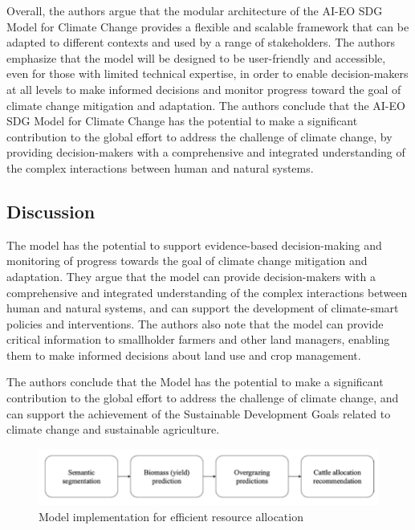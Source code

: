 \documentclass[draft, {\secondLanguage}, english]{volcanica-template}
\begin{document}
Overall, the authors argue that the modular architecture of the AI-EO SDG Model for Climate Change provides a flexible and scalable framework that can be adapted to different contexts and used by a range of stakeholders. The authors emphasize that the model will be designed to be user-friendly and accessible, even for those with limited technical expertise, in order to enable decision-makers at all levels to make informed decisions and monitor progress toward the goal of climate change mitigation and adaptation. The authors conclude that the AI-EO SDG Model for Climate Change has the potential to make a significant contribution to the global effort to address the challenge of climate change, by providing decision-makers with a comprehensive and integrated understanding of the complex interactions between human and natural systems.

\subsection{Discussion}
The model has the potential to support evidence-based decision-making and monitoring of progress towards the goal of climate change mitigation and adaptation. They argue that the model can provide decision-makers with a comprehensive and integrated understanding of the complex interactions between human and natural systems, and can support the development of climate-smart policies and interventions. The authors also note that the model can provide critical information to smallholder farmers and other land managers, enabling them to make informed decisions about land use and crop management.

The authors conclude that the Model has the potential to make a significant contribution to the global effort to address the challenge of climate change, and can support the achievement of the Sustainable Development Goals related to climate change and sustainable agriculture.

\begin{figure}[!t]								%
\centering
\includegraphics[width=\textwidth]{Images/fig4-3.png} 
\caption{Model implementation for efficient resource allocation}	
\label{fig:04}									
\end{figure}
\end{document}
